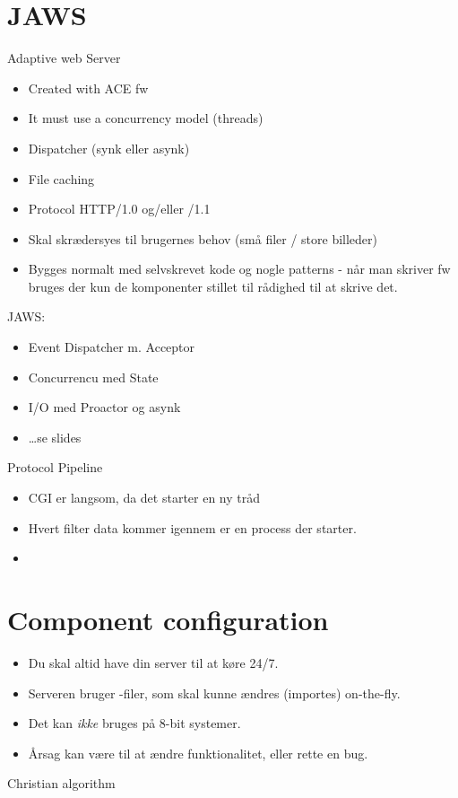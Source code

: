 \documentclass[oneside, 10pt]{memoir}
\begin{document}
\section*{JAWS}
Adaptive web Server
\begin{itemize}
	\item Created with ACE fw
	\item It must use a concurrency model (threads)
	\item Dispatcher (synk eller asynk)
	\item File caching
	\item Protocol HTTP/1.0 og/eller /1.1
	\item Skal skrædersyes til brugernes behov (små filer / store billeder)
	\item Bygges normalt med selvskrevet kode og nogle patterns - når man skriver fw bruges der kun de komponenter stillet til rådighed til at skrive det.
\end{itemize}
JAWS:
\begin{itemize}
	\item Event Dispatcher m. Acceptor 
	\item Concurrencu med State
	\item I/O med Proactor og asynk
	\item \dots se slides
\end{itemize}
Protocol Pipeline
\begin{itemize}
	\item CGI er langsom, da det starter en ny tråd
	\item Hvert filter data kommer igennem er en process der starter.
	\item 
\end{itemize}





\newpage
\section*{Component configuration}
\begin{itemize}
	\item Du skal altid have din server til at køre 24/7.
	\item Serveren bruger -filer, som skal kunne ændres (importes) on-the-fly.
	\item Det kan \emph{ikke} bruges på 8-bit systemer.
	\item Årsag kan være til at ændre funktionalitet, eller rette en bug.
\end{itemize}
Christian algorithm
\end{document}
